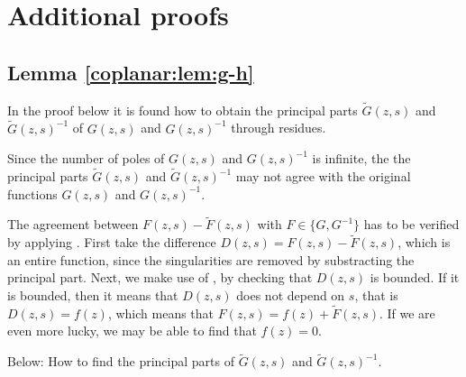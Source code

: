

\section{Additional proofs}

\subsection{Lemma \ref{coplanar:lem:g-h}}

In the proof below it is found how to obtain the principal parts
$\tilde{G}(z,s)$ and $\tilde{G}(z,s)^{-1}$ of $G(z,s)$ and $G(z,s)^{-1}$ through residues.

Since the number of poles of $G(z,s)$ and $G(z,s)^{-1}$ is infinite,
the the principal parts $\tilde{G}(z,s)$ and $\tilde{G}(z,s)^{-1}$
may not agree with the original functions $G(z,s)$ and $G(z,s)^{-1}$.

The agreement between $F(z,s) - \tilde{F}(z,s)$ with $F \in \{G, G^{-1}\}$ has to be verified
by applying .
First take the difference $D(z,s) = F(z,s) - \tilde{F}(z,s)$, which is an entire function,
since the singularities are removed by substracting the principal part.
Next, we make use of ,
by checking that $D(z,s)$ is bounded.
If it is bounded, then it means that $D(z,s)$ does not depend on $s$, that is $D(z,s) = f(z)$,
which means that $F(z,s) = f(z) + \tilde{F}(z,s)$.
If we are even more lucky, we may be able to find that $f(z) = 0$.

Below: How to find the principal parts of $\tilde{G}(z,s)$ and $\tilde{G}(z,s)^{-1}$.

